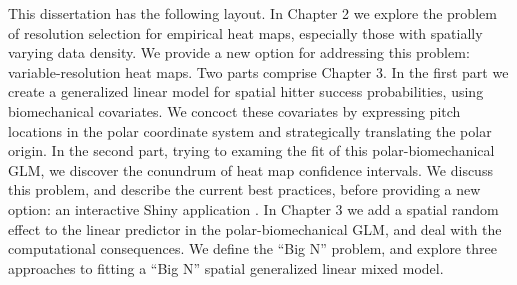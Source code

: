 This dissertation has the following layout. In Chapter 2 we explore the problem of resolution selection for empirical heat maps, especially those with spatially varying data density. We provide a new option for addressing this problem: variable-resolution heat maps. Two parts comprise Chapter 3. In the first part we create a generalized linear model for spatial hitter success probabilities, using biomechanical covariates. We concoct these covariates by expressing pitch locations in the polar coordinate system and strategically translating the polar origin. In the second part, trying to examing the fit of this polar-biomechanical GLM, we discover the conundrum of heat map confidence intervals. We discuss this problem, and describe the current best practices, before providing a new option: an interactive Shiny application \citep{Shiny}. In Chapter 3 we add a spatial random effect to the linear predictor in the polar-biomechanical GLM, and deal with the computational consequences. We define the ``Big N'' problem, and explore three approaches to fitting a ``Big N'' spatial generalized linear mixed model. 

